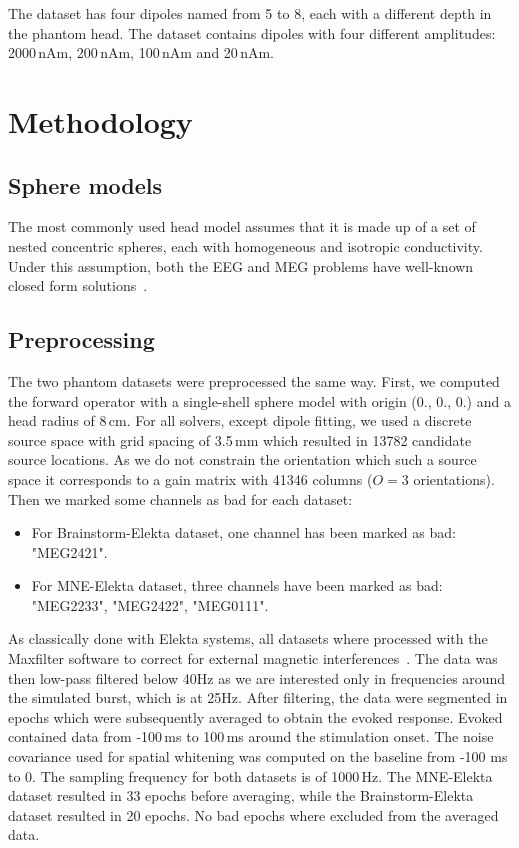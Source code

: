 The dataset has four dipoles named from 5 to 8, each with a different depth in the phantom head. The dataset contains dipoles with four different amplitudes: 2000\,nAm, 200\,nAm, 100\,nAm and 20\,nAm.

\section{Methodology}

\subsection{Sphere models}
The most commonly used head model assumes that it is made up of a set of nested concentric spheres, each with homogeneous and isotropic conductivity. Under this assumption, both the EEG and MEG problems have well-known closed form solutions~\cite{mosher1999eeg}.

\subsection{Preprocessing}
The two phantom datasets were preprocessed the same way. First, we computed the forward operator with a single-shell sphere model with origin (0., 0., 0.) and a head radius of 8\,cm. For all solvers, except dipole fitting, we used a discrete source space with grid spacing of 3.5\,mm which resulted in 13782 candidate source locations. As we do not constrain the orientation which such a source space it corresponds to a gain matrix with 41346 columns ($O=3$ orientations). Then we marked some channels as bad for each dataset:
\begin{itemize}
\item For Brainstorm-Elekta dataset, one channel has been marked as bad: "MEG2421".
\item For MNE-Elekta dataset, three channels have been marked as bad: \\"MEG2233", "MEG2422", "MEG0111".
\end{itemize}

As classically done with Elekta systems, all datasets where processed with the Maxfilter software to correct for external magnetic interferences~\cite{43taulu2006spatiotemporal}. The data was then low-pass filtered below 40Hz as we are interested only in frequencies around the simulated burst, which is at 25Hz. After filtering, the data were segmented in epochs which were subsequently averaged to obtain the evoked response. Evoked contained data from -100\,ms to 100\,ms around the stimulation onset. The noise covariance used for spatial whitening was computed on the baseline from -100 ms to 0. The sampling frequency for both datasets is of 1000\,Hz.
The MNE-Elekta dataset resulted in 33 epochs before averaging, while the Brainstorm-Elekta dataset resulted in 20 epochs.
No bad epochs where excluded from the averaged data.

